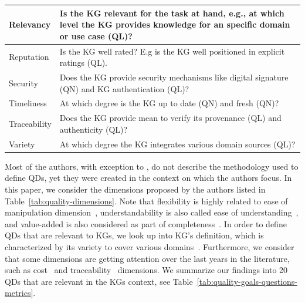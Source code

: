 \documentclass[runningheads]{llncs}
\begin{document}
\begin{table}
\begin{threeparttable}
\begin{tabular}{|p{2.7cm}|p{9cm}|}
\hline
Relevancy & Is the KG relevant for the task at hand, e.g., at which level the KG provides knowledge for an specific domain or use case (QL)? \\ 
\hline
Reputation & Is the KG well rated? E.g is the KG well positioned in explicit ratings (QL). \\ 
\hline
Security &  Does the KG provide security mechanisms like digital signature (QN) and KG authentication (QL)?  \\
\hline
Timeliness & At which degree is the KG up to date (QN) and fresh (QN)? \\ 
\hline
Traceability & Does the KG provide mean to verify its provenance (QL) and authenticity (QL)? \\ 
\hline
Variety & At which degree the KG integrates various domain sources (QL)? \\
\hline
\end{tabular}
\begin{tablenotes}
    \item [QN: Quantitatively measured metrics.]
    \item [QL: Qualitatively measured metrics.]
\end{tablenotes}
\end{threeparttable}
\end{table}
Most of the authors, with exception to \cite{WangS96,ZaveriRMPLA16}, do not describe the methodology used to define QDs, yet they were created in the context on which the authors focus. In this paper, we consider the dimensions proposed by the authors listed in Table~\ref{tab:quality-dimensions}. Note that flexibility is highly related to ease of manipulation dimension~\cite{FenselSAHKPTUW20}, understandability is also called ease of understanding~\cite{ZaveriRMPLA16}, and value-added is also considered as part of completeness~\cite{FarberBMR18}. In order to define QDs that are relevant to KGs, we look up into KG's definition, which is characterized by its variety to cover various domains~\cite{FarberBMR18,FenselSAHKPTUW20,Paulheim17}. Furthermore, we consider that some dimensions are getting attention over the last years in the literature, such as cost~\cite{FenselSAHKPTUW20,Lenat95,HuamanF21,WangS96} and traceability~\cite{FenselSAHKPTUW20,HuamanKF2020,HuamanTF21} dimensions. We summarize our findings into 20 QDs that are relevant in the KGs context, see Table~\ref{tab:quality-goals-questions-metrics}.

% 
\end{document}
